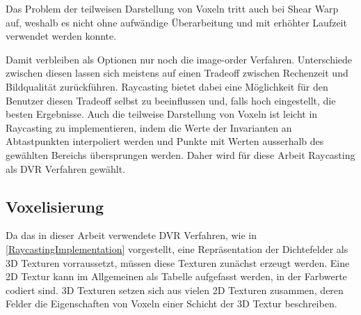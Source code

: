 \documentclass[a4paper,fontsize=12pt,toc=bib,halfparskip,ngerman]{scrartcl}
\begin{document}
Das Problem der teilweisen Darstellung von Voxeln tritt auch bei Shear Warp auf, weshalb es nicht ohne aufw\"andige \"Uberarbeitung und mit erh\"ohter Laufzeit verwendet werden konnte.

Damit verbleiben als Optionen nur noch die image-order Verfahren. Unterschiede zwischen diesen lassen sich meistens auf einen Tradeoff zwischen Rechenzeit und Bildqualit\"at zur\"uckf\"uhren. Raycasting bietet dabei eine M\"oglichkeit f\"ur den Benutzer diesen Tradeoff selbst zu beeinflussen und, falls hoch eingestellt, die besten Ergebnisse. Auch die teilweise Darstellung von Voxeln ist leicht in Raycasting zu implementieren, indem die Werte der Invarianten an Abtastpunkten interpoliert werden und Punkte mit Werten ausserhalb des gew\"ahlten Bereichs \"ubersprungen werden. Daher wird f\"ur diese Arbeit Raycasting als DVR Verfahren gew\"ahlt.

\subsection{Voxelisierung}
Da das in dieser Arbeit verwendete DVR Verfahren, wie in \cref{RaycastingImplementation} vorgestellt, eine Repr\"asentation der Dichtefelder als 3D Texturen vorraussetzt, m\"ussen diese Texturen zun\"achst erzeugt werden. Eine 2D Textur kann im Allgemeinen als Tabelle aufgefasst werden, in der Farbwerte codiert sind. 3D Texturen setzen sich aus vielen 2D Texturen zusammen, deren Felder die Eigenschaften von Voxeln einer Schicht der 3D Textur beschreiben. 
\end{document}
